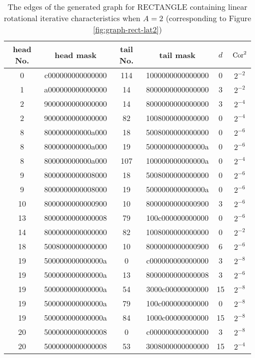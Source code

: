 \begin{table}
	\caption{The edges of the generated graph for RECTANGLE containing linear rotational iterative characteristics when $A=2$ (corresponding to Figure \ref{fig:graph-rect-lat2})}\label{tab:dis-rect-lat2}
	\centering
	\begin{tabular}{|c|c|c|c|c|c|}
		\hline
		head No. & head mask & tail No. & tail mask & $d$ & $\text{Cor}^2$ \\
		\hline
        0 & c000000000000000 & 114 & 1000000000000000 & 0 & $2^{-2}$ \\
        1 & a000000000000000 & 14 & 8000000000000000 & 3 & $2^{-2}$ \\
        2 & 9000000000000000 & 14 & 8000000000000000 & 3 & $2^{-4}$ \\
        2 & 9000000000000000 & 82 & 1008000000000000 & 0 & $2^{-4}$ \\
        8 & 800000000000a000 & 18 & 5008000000000000 & 0 & $2^{-6}$ \\
        8 & 800000000000a000 & 19 & 500000000000000a & 0 & $2^{-6}$ \\
        8 & 800000000000a000 & 107 & 100000000000000a & 0 & $2^{-4}$ \\
        9 & 8000000000008000 & 18 & 5008000000000000 & 0 & $2^{-6}$ \\
        9 & 8000000000008000 & 19 & 500000000000000a & 0 & $2^{-6}$ \\
        10 & 8000000000000900 & 10 & 8000000000000900 & 3 & $2^{-6}$ \\
        13 & 8000000000000008 & 79 & 100c000000000000 & 0 & $2^{-6}$ \\
        14 & 8000000000000000 & 82 & 1008000000000000 & 0 & $2^{-2}$ \\
        18 & 5008000000000000 & 10 & 8000000000000900 & 6 & $2^{-6}$ \\
        19 & 500000000000000a & 0 & c000000000000000 & 3 & $2^{-8}$ \\
        19 & 500000000000000a & 13 & 8000000000000008 & 3 & $2^{-6}$ \\
        19 & 500000000000000a & 54 & 3000c00000000000 & 15 & $2^{-8}$ \\
        19 & 500000000000000a & 79 & 100c000000000000 & 0 & $2^{-8}$ \\
        19 & 500000000000000a & 84 & 1000c00000000000 & 15 & $2^{-8}$ \\
        20 & 5000000000000008 & 0 & c000000000000000 & 3 & $2^{-8}$ \\
        20 & 5000000000000008 & 53 & 3008000000000000 & 15 & $2^{-4}$ \\

\end{tabular}
\end{table}
